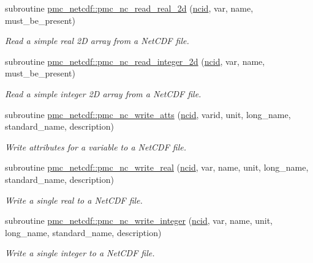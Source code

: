 \begin{DoxyCompactItemize}
subroutine \mbox{\hyperlink{namespacepmc__netcdf_a12c72b4b7438c2c715be55c435d8d1fc}{pmc\+\_\+netcdf\+::pmc\+\_\+nc\+\_\+read\+\_\+real\+\_\+2d}} (\mbox{\hyperlink{fractal_8_f90_a4e89f3f850921ff84a6dfce8b166ad50}{ncid}}, var, name, must\+\_\+be\+\_\+present)
\begin{DoxyCompactList}\small\item\em Read a simple real 2D array from a Net\+C\+DF file. \end{DoxyCompactList}\item 
subroutine \mbox{\hyperlink{namespacepmc__netcdf_a1dccd30c85af447ee1bad6bb7a6ad0ab}{pmc\+\_\+netcdf\+::pmc\+\_\+nc\+\_\+read\+\_\+integer\+\_\+2d}} (\mbox{\hyperlink{fractal_8_f90_a4e89f3f850921ff84a6dfce8b166ad50}{ncid}}, var, name, must\+\_\+be\+\_\+present)
\begin{DoxyCompactList}\small\item\em Read a simple integer 2D array from a Net\+C\+DF file. \end{DoxyCompactList}\item 
subroutine \mbox{\hyperlink{namespacepmc__netcdf_aec38f84822ec8fa3ecbed6e69a24d274}{pmc\+\_\+netcdf\+::pmc\+\_\+nc\+\_\+write\+\_\+atts}} (\mbox{\hyperlink{fractal_8_f90_a4e89f3f850921ff84a6dfce8b166ad50}{ncid}}, varid, unit, long\+\_\+name, standard\+\_\+name, description)
\begin{DoxyCompactList}\small\item\em Write attributes for a variable to a Net\+C\+DF file. \end{DoxyCompactList}\item 
subroutine \mbox{\hyperlink{namespacepmc__netcdf_ac319a94ac04f697f1c6623740101016a}{pmc\+\_\+netcdf\+::pmc\+\_\+nc\+\_\+write\+\_\+real}} (\mbox{\hyperlink{fractal_8_f90_a4e89f3f850921ff84a6dfce8b166ad50}{ncid}}, var, name, unit, long\+\_\+name, standard\+\_\+name, description)
\begin{DoxyCompactList}\small\item\em Write a single real to a Net\+C\+DF file. \end{DoxyCompactList}\item 
subroutine \mbox{\hyperlink{namespacepmc__netcdf_a4100434b6509117a5147ee13448f6df2}{pmc\+\_\+netcdf\+::pmc\+\_\+nc\+\_\+write\+\_\+integer}} (\mbox{\hyperlink{fractal_8_f90_a4e89f3f850921ff84a6dfce8b166ad50}{ncid}}, var, name, unit, long\+\_\+name, standard\+\_\+name, description)
\begin{DoxyCompactList}\small\item\em Write a single integer to a Net\+C\+DF file. \end{DoxyCompactList}\item 

\end{DoxyCompactItemize}
